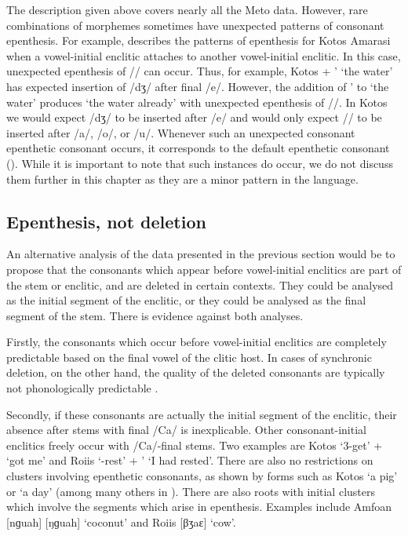 \documentclass[output=paper]{langscibook}
\begin{document}
The description given above covers nearly all the Meto data.
However, rare combinations of morphemes sometimes have
unexpected patterns of consonant epenthesis.
For example, \citet[244ff]{ed20} describes
the patterns of epenthesis for Kotos Amarasi
when a vowel-initial enclitic attaches to another vowel-initial enclitic.
In this case, unexpected epenthesis of /\gw/ can occur.
Thus, for example, Kotos  +  ' {\ra}  `the water'
has expected insertion of \mbox{/dʒ/} after final /e/.
However, the addition of  ' to  `the water'
produces  `the water already' with
unexpected epenthesis of /\gw/.
In Kotos we would expect /dʒ/ to be inserted after /e/
and would only expect /\gw/ to be inserted after /a/, /o/, or /u/.
Whenever such an unexpected consonant epenthetic consonant
occurs, it corresponds to the default epenthetic consonant ().
While it is important to note that such instances do occur,
we do not discuss them further in this chapter as
they are a minor pattern in the language.

\subsection{Epenthesis, not deletion}\label{sec:InsNotDel}
An alternative analysis of the data presented in the previous
section would be to propose that the consonants which appear
before vowel-initial enclitics are part of the stem or enclitic, and are deleted in certain contexts.
They could be analysed as the initial segment of the enclitic,
or they could be analysed as the final segment of the stem.
There is evidence against both analyses.

\hspace*{-3.6pt}Firstly, the consonants which occur before vowel-initial
enclitics are completely predictable based
on the final vowel of the clitic host.
In cases of synchronic deletion, on the other hand,
the quality of the deleted consonants are typically
not phonologically predictable \citep{ha11-delete}.

Secondly, if these consonants are actually the initial
segment of the enclitic, their absence after stems
with final /Ca/ is inexplicable.
Other consonant-initial enclitics 
freely occur with /Ca/-final stems. 
Two examples are Kotos  `3-get' +   {\ra}
 `got me' and
Roi{\Q}is  `-rest' +  '
{\ra}  `I had rested'.
There are also no restrictions on
clusters involving epenthetic consonants, as shown by forms
such as Kotos  `a pig' or  `a day'
(among many others in ).
There are also roots with initial clusters which involve
the segments which arise in epenthesis.
Examples include Amfo{\Q}an  [nɡuah] {\tl} [ŋɡuah] `coconut'
and Roi{\Q}is  [βʒaɛ] `cow'.
\end{document}
